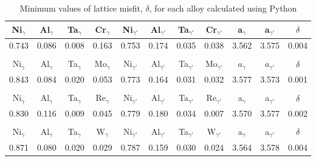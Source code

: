 \begin{table}[H]
  \centering
  \begin{tabular}{rrrrrrrrrrr}
    \multicolumn{1}{c}{Ni$_\gamma$} & \multicolumn{1}{c}{Al$_\gamma$} & \multicolumn{1}{c}{Ta$_\gamma$} & \multicolumn{1}{c}{Cr$_\gamma$} & \multicolumn{1}{c}{Ni$_{\gamma'}$} & \multicolumn{1}{c}{Al$_{\gamma'}$} & \multicolumn{1}{c}{Ta$_{\gamma'}$} & \multicolumn{1}{c}{Cr$_{\gamma'}$} & \multicolumn{1}{c}{a$_\gamma$} & \multicolumn{1}{c}{a$_{\gamma'}$} & \multicolumn{1}{c}{$\delta$} \\ \hline \hline
    0.743 & 0.086 & 0.008 & 0.163 & 0.753 & 0.174 & 0.035 & 0.038 & 3.562 & 3.575 & 0.004 \\\\
   \multicolumn{1}{c}{Ni$_\gamma$} & \multicolumn{1}{c}{Al$_\gamma$} & \multicolumn{1}{c}{Ta$_\gamma$} & \multicolumn{1}{c}{Mo$_\gamma$} & \multicolumn{1}{c}{Ni$_{\gamma'}$} & \multicolumn{1}{c}{Al$_{\gamma'}$} & \multicolumn{1}{c}{Ta$_{\gamma'}$} & \multicolumn{1}{c}{Mo$_{\gamma'}$} & \multicolumn{1}{c}{$a_\gamma$} & \multicolumn{1}{c}{$a_{\gamma'}$} & \multicolumn{1}{c}{$\delta$} \\ \hline \hline
   0.843 & 0.084 & 0.020 & 0.053 & 0.773 & 0.164 & 0.031 & 0.032 & 3.577 & 3.573 & 0.001 \\\\
   \multicolumn{1}{c}{Ni$_\gamma$} & \multicolumn{1}{c}{Al$_\gamma$} & \multicolumn{1}{c}{Ta$_\gamma$} & \multicolumn{1}{c}{Re$_\gamma$} & \multicolumn{1}{c}{Ni$_{\gamma'}$} & \multicolumn{1}{c}{Al$_{\gamma'}$} & \multicolumn{1}{c}{Ta$_{\gamma'}$} & \multicolumn{1}{c}{Re$_{\gamma'}$} & \multicolumn{1}{c}{a$_\gamma$} & \multicolumn{1}{c}{a$_{\gamma'}$} & \multicolumn{1}{c}{$\delta$} \\ \hline \hline
   0.830 & 0.116 & 0.009 & 0.045 & 0.779 & 0.180 & 0.034 & 0.007 & 3.570 & 3.577 & 0.002 \\\\
   \multicolumn{1}{c}{Ni$_\gamma$} & \multicolumn{1}{c}{Al$_\gamma$} & \multicolumn{1}{c}{Ta$_\gamma$} & \multicolumn{1}{c}{W$_\gamma$} & \multicolumn{1}{c}{Ni$_{\gamma'}$} & \multicolumn{1}{c}{Al$_{\gamma'}$} & \multicolumn{1}{c}{Ta$_{\gamma'}$} & \multicolumn{1}{c}{W$_{\gamma'}$} & \multicolumn{1}{c}{a$_\gamma$} & \multicolumn{1}{c}{a$_{\gamma'}$} & \multicolumn{1}{c}{$\delta$} \\ \hline \hline
   0.871 & 0.080 & 0.020 & 0.029 & 0.787 & 0.159 & 0.030 & 0.024 & 3.564 & 3.578 & 0.004
  \end{tabular}
  \caption{Minimum values of lattice misfit, $\delta$, for each alloy calculated using Python \citep{mygit}}
  \label{tab:tab04}
\end{table}

